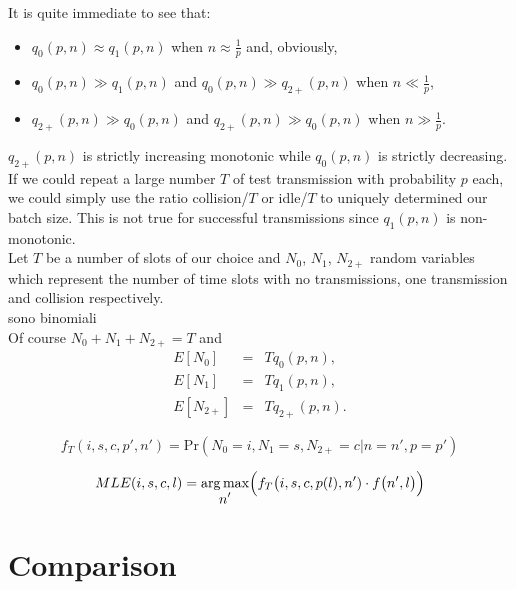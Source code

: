 \documentclass[12pt,a4paper]{report}
\DeclareMathOperator*{\argmax}{arg\,max}
\begin{document}
It is quite immediate to see that:
\begin{itemize}
\item $q_{0}(p,n) \approx q_{1}(p,n)$ when $n\approx {\displaystyle\frac{1}{p}}$ and, obviously,
\item $q_{0}(p,n) \gg q_{1}(p,n)$ and $q_{0}(p,n) \gg q_{2+}(p,n)$ when $n \ll {\displaystyle\frac{1}{p}}$,
\item $q_{2+}(p,n) \gg q_{0}(p,n)$ and $q_{2+}(p,n) \gg q_{0}(p,n)$ when $n \gg {\displaystyle\frac{1}{p}}$.
\end{itemize}
$q_{2+}(p,n)$ is strictly increasing monotonic while $q_{0}(p,n)$ is strictly decreasing. If we could repeat a large number $T$ of test transmission with  probability $p$ each, we could simply use the ratio collision/$T$ or idle/$T$ to uniquely determined our batch size. This is not true for successful transmissions since $q_{1}(p,n)$ is non-monotonic.\\
 
 Let $T$ be a number of slots of our choice and $N_{0}$, $N_{1}$, $N_{2+}$ random variables which represent the number of time slots with no transmissions, one transmission and collision respectively.\\
 sono binomiali\\
 Of course $N_{0}+N_{1}+N_{2+}=T$ and
 \begin{eqnarray*}
E[N_{0}] &=& Tq_{0}(p,n),\\
E[N_{1}] &=& Tq_{1}(p,n),\\
E[N_{2+}] &=& Tq_{2+}(p,n).
\end{eqnarray*}


\begin{equation}
f_{T}(i,s,c,p',n')= \textrm{Pr}(N_{0}=i,N_{1}=s,N_{2+}=c|n=n',p=p')
\end{equation}

\begin{equation}
MLE(i,s,c,l)=\argmax_{\displaystyle{n'}} \Bigl( f_{T}\bigl(i,s,c,p(l),n')\cdot f\bigl(n',l\bigr)\Bigr)
\end{equation}

\chapter{Comparison}
\label{ch:Comparison}
\end{document}
